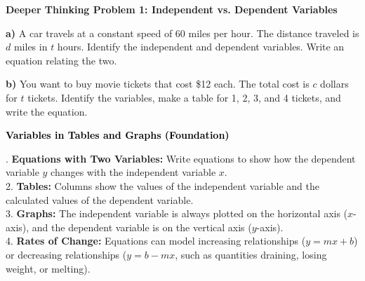 \documentclass[12pt, letterpaper, fleqn]{article}
\begin{document}
\begin{tcolorbox}[colback=white, colframe=black, boxrule=1pt, arc=4mm, left=6mm, right=6mm, top=5mm, bottom=5mm]
\textbf{Deeper Thinking Problem 1: Independent vs. Dependent Variables}

\medskip

\noindent
\textbf{a)} A car travels at a constant speed of 60 miles per hour. The distance traveled is $d$ miles in $t$ hours. Identify the independent and dependent variables. Write an equation relating the two.

\vspace{4.5cm}

\noindent
\textbf{b)} You want to buy movie tickets that cost \$12 each. The total cost is $c$ dollars for $t$ tickets. Identify the variables, make a table for 1, 2, 3, and 4 tickets, and write the equation.

\vspace{4.5cm}
\end{tcolorbox}
\newpage

\begin{tcolorbox}[colback=black!10]
    \large\textcolor{black}{\textbf{Variables in Tables and Graphs (Foundation)}}
\end{tcolorbox}

\vspace{3mm}

. \textbf{Equations with Two Variables:} Write equations to show how the dependent variable $y$ changes with the independent variable $x$. \\
2. \textbf{Tables:} Columns show the values of the independent variable and the calculated values of the dependent variable. \\
3. \textbf{Graphs:} The independent variable is always plotted on the horizontal axis ($x$-axis), and the dependent variable is on the vertical axis ($y$-axis).\\
4. \textbf{Rates of Change:} Equations can model increasing relationships ($y = mx + b$) or decreasing relationships ($y = b - mx$, such as quantities draining, losing weight, or melting).

\vspace{4mm}
\end{document}
